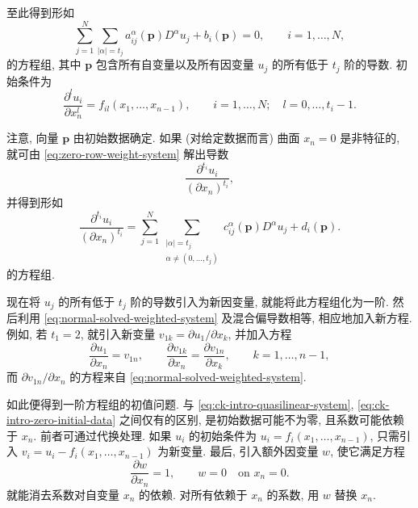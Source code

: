 至此得到形如
\begin{equation}\label{eq:zero-row-weight-system}
\sum_{j=1}^N\sum_{|\alpha|=t_j}a_{ij}^{\alpha}(\bm{p})D^\alpha u_j+b_i(\bm{p})=0,\qquad i=1,\ldots,N,
\end{equation}
的方程组, 其中 $\bm{p}$ 包含所有自变量以及所有因变量 $u_j$ 的所有低于 $t_j$ 阶的导数. 初始条件为
\begin{equation}\label{eq:weighted-system-initial-derivatives}
\dfrac{\partial^l u_i}{\partial x_n^l}=f_{il}(x_1,\ldots,x_{n-1}),\qquad i=1,\ldots,N;\quad l=0,\ldots,t_i-1.
\end{equation}


注意, 向量 $\bm{p}$ 由初始数据确定. 如果 (对给定数据而言) 曲面 $x_n=0$ 是非特征的, 就可由 \eqref{eq:zero-row-weight-system} 解出导数
\begin{equation}\label{eq:highest-normal-derivatives}
\dfrac{\partial^{t_i}u_i}{(\partial x_n)^{t_i}},
\end{equation}
并得到形如
\begin{equation}\label{eq:normal-solved-weighted-system}
\dfrac{\partial^{t_i}u_i}{(\partial x_n)^{t_i}}=\sum_{j=1}^N\sum_{\substack{|\alpha|=t_j\\\alpha\ne(0,\ldots,t_j)}}c_{ij}^{\alpha}(\bm{p})D^\alpha u_j+d_i(\bm{p}).
\end{equation}
的方程组.

现在将 $u_j$ 的所有低于 $t_j$ 阶的导数引入为新因变量, 就能将此方程组化为一阶. 然后利用 \eqref{eq:normal-solved-weighted-system} 及混合偏导数相等, 相应地加入新方程. 例如, 若 $t_1=2$, 就引入新变量 $v_{1k}=\partial u_1/\partial x_k$, 并加入方程
\begin{equation}\label{eq:reduction-first-order-derivative-relations}
\dfrac{\partial u_1}{\partial x_n}=v_{1n},\qquad\dfrac{\partial v_{1k}}{\partial x_n}=\dfrac{\partial v_{1n}}{\partial x_k},\qquad k=1,\ldots,n-1,
\end{equation}
而 $\partial v_{1n}/\partial x_n$ 的方程来自 \eqref{eq:normal-solved-weighted-system}.

如此便得到一阶方程组的初值问题. 与 \eqref{eq:ck-intro-quasilinear-system}, \eqref{eq:ck-intro-zero-initial-data} 之间仅有的区别, 是初始数据可能不为零, 且系数可能依赖于 $x_n$. 前者可通过代换处理. 如果 $u_i$ 的初始条件为 $u_i=f_i(x_1,\ldots,x_{n-1})$, 只需引入 $v_i=u_i-\allowbreak f_i(x_1,\ldots,x_{n-1})$ 为新变量. 最后, 引入额外因变量 $w$, 使它满足方程
\begin{equation}\label{eq:reduction-extra-independent-coordinate}
\dfrac{\partial w}{\partial x_n}=1,\qquad w=0\quad\text{on }x_n=0.
\end{equation}
就能消去系数对自变量 $x_n$ 的依赖. 对所有依赖于 $x_n$ 的系数, 用 $w$ 替换 $x_n$.

